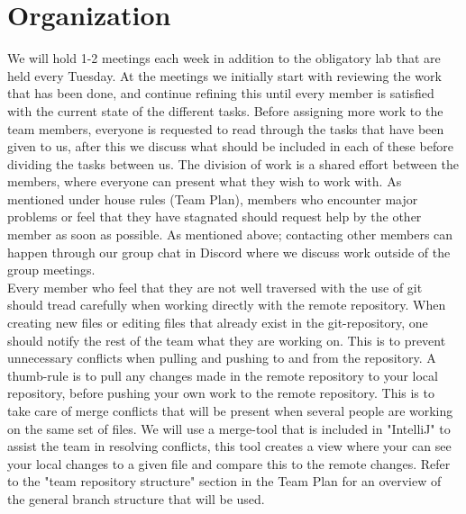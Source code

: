 \documentclass{article}
\begin{document}
    \section{Organization}
    \noindent
    We will hold 1-2 meetings each week in addition to the obligatory lab that are held every Tuesday. At the meetings we initially start with reviewing the work that has been done, and continue refining this until every member is satisfied with the current state of the different tasks. Before assigning more work to the team members, everyone is requested to read through the tasks that have been given to us, after this we discuss what should be included in each of these before dividing the tasks between us. The division of work is a shared effort between the members, where everyone can present what they wish to work with. As mentioned under house rules (Team Plan), members who encounter major problems or feel that they have stagnated should request help by the other member as soon as possible. As mentioned above; contacting other members can happen through our group chat in Discord where we discuss work outside of the group meetings. \\

    \noindent
    Every member who feel that they are not well traversed with the use of git should tread carefully when working directly with the remote repository. When creating new files or editing files that already exist in the git-repository, one should notify the rest of the team what they are working on. This is to prevent unnecessary conflicts when pulling and pushing to and from the repository. A thumb-rule is to pull any changes made in the remote repository to your local repository, before pushing your own work to the remote repository. This is to take care of merge conflicts that will be present when several people are working on the same set of files. We will use a merge-tool that is included in "IntelliJ" to assist the team in resolving conflicts, this tool creates a view where your can see your local changes to a given file and compare this to the remote changes. Refer to the "team repository structure" section in the Team Plan for an overview of the general branch structure that will be used. \\
\end{document}
